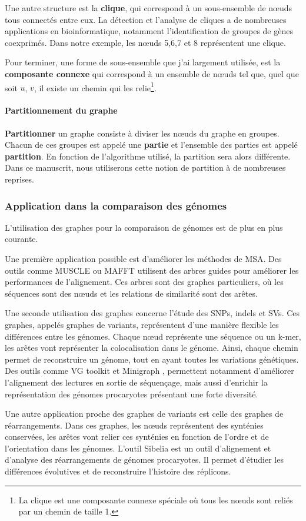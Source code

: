Une autre structure est la \textbf{clique}, qui correspond à un sous-ensemble de n\oe uds tous connectés entre eux. La détection et l'analyse de cliques a de nombreuses applications en bioinformatique, notamment l'identification de groupes de gènes coexprimés. Dans notre exemple, les n\oe uds 5,6,7 et 8 représentent une clique. 

Pour terminer, une forme de sous-ensemble que j'ai largement utilisée, est la \textbf{composante connexe} qui correspond à un ensemble de n\oe uds tel que, quel que soit $u$, $v$, il existe un chemin  qui les relie\footnote{La clique est une composante connexe spéciale où tous les n\oe uds sont reliés par un chemin de taille 1.}.

\paragraph{Partitionnement du graphe}

\textbf{Partitionner} un graphe consiste à diviser les n\oe uds du graphe en groupes. Chacun de ces groupes est appelé une \textbf{partie} et l'ensemble des parties est appelé \textbf{partition}. En fonction de l'algorithme utilisé, la partition sera alors différente. Dans ce manuscrit, nous utiliserons cette notion de partition à  de nombreuses reprises.

\subsubsection{Application dans la comparaison des génomes}

L'utilisation des graphes pour la comparaison de génomes est de plus en plus courante. 

Une première application possible est d'améliorer les méthodes de MSA. Des outils comme MUSCLE ou MAFFT \cite{katoh_mafft_2013} utilisent des arbres guides pour améliorer les performances de l'alignement. Ces arbres sont des graphes particuliers, où les séquences sont des n\oe uds et les relations de similarité sont des arêtes.

\newpage
Une seconde utilisation des graphes concerne l'étude des SNPs, indels et SVs. Ces graphes, appelés graphes de variants, représentent d'une manière flexible les différences entre les génomes. Chaque n\oe ud représente une séquence ou un k-mer, les arêtes vont représenter la colocalisation dans le génome. Ainsi, chaque chemin permet de reconstruire un génome, tout en ayant toutes les variations génétiques. Des outils comme VG toolkit \cite{garrison_variation_2018} et Minigraph \cite{li_design_2020}, permettent notamment d'améliorer l'alignement des lectures en sortie de séquençage, mais aussi d'enrichir la représentation des génomes procaryotes présentant une forte diversité.

Une autre application proche des graphes de variants est celle des graphes de réarrangements. Dans ces graphes, les n\oe uds représentent des synténies conservées, les arêtes vont relier ces synténies en fonction de l'ordre et de l'orientation dans les génomes. L'outil Sibelia \cite{minkin_sibelia_2013} est un outil d'alignement et d'analyse des réarrangements de génomes procaryotes. Il permet  d'étudier les différences évolutives et de reconstruire l'histoire des réplicons.

